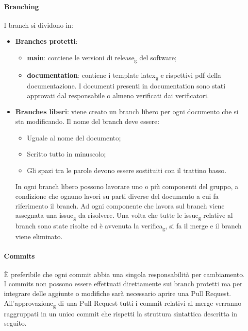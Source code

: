 \paragraph{Branching}
I branch si dividono in: 
\begin{itemize}
	\item \textbf{Branches protetti}:
    \begin{itemize} 
        \item \textbf{main}: contiene le versioni di release\textsubscript{g} del software;
        \item \textbf{documentation}: contiene i template latex\textsubscript{g} e rispettivi pdf della documentazione. I documenti presenti 
		in documentation sono stati approvati dal responsabile o almeno verificati dai verificatori.
    \end{itemize}
	\item \textbf{Branches liberi}: viene creato un branch libero per ogni documento che si sta modificando. Il nome del branch deve essere:
	\begin{itemize}	
		\item Uguale al nome del documento;
		\item Scritto tutto in minuscolo;
		\item Gli spazi tra le parole devono essere sostituiti con il trattino basso.
	\end{itemize}
	
	In ogni branch libero possono lavorare uno o più componenti del gruppo, a condizione che ognuno lavori su parti diverse 
	del documento a cui fa riferimento il branch. Ad ogni componente che lavora sul branch  
	viene assegnata una issue\textsubscript{g} da risolvere. Una volta che tutte le issue\textsubscript{g} relative al branch sono state risolte ed è avvenuta 
	la verifica\textsubscript{g}, si fa il merge e il branch viene eliminato.
\end{itemize}

\paragraph{Commits}
\label{Commits}
È preferibile che ogni commit abbia una singola responsabilità per cambiamento.\\
I commits non possono essere effettuati direttamente sui branch protetti ma per integrare delle aggiunte o modifiche sarà necessario aprire una Pull Request.
All'approvazione\textsubscript{g} di una Pull Request tutti i commit relativi al merge verranno raggruppati in un unico commit che rispetti la struttura sintattica descritta in seguito.

